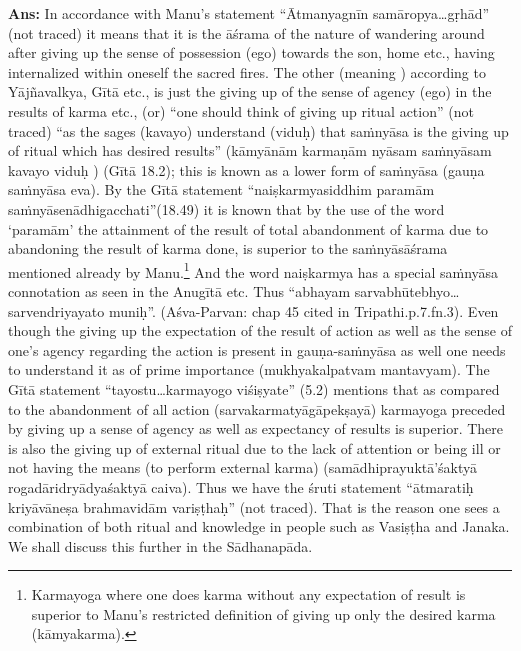 \textbf{Ans:} In accordance with Manu’s statement  “Ātmanyagnīn samāropya\-…gṛhād” (not traced) it means that it is the āśrama of the nature of wandering around after giving up the sense of possession (ego) towards the son, home etc., having internalized within oneself the sacred fires. The other (meaning ) according to Yājñavalkya, Gītā etc., is just the giving up of the sense of agency (ego) in the results of karma etc., (or) “one should think of giving up ritual action” (not traced) “as the sages (kavayo) understand (viduḥ) that saṁnyāsa is the giving up of ritual which has desired results” (kāmyānām karmaṇām nyāsam saṁnyāsam kavayo viduḥ ) (Gītā 18.2); this is known as a lower form of saṁnyāsa (gauṇa saṁnyāsa eva). By the Gītā statement “naiṣkarmyasiddhim paramām saṁnyāsenādhigacchati”(18.49) it  is known that by the use of the word ‘paramām’ the attainment of the result of total abandonment of karma due to abandoning the result of karma done, is superior to the saṁnyāsāśrama mentioned already by Manu.\footnote{Karmayoga where one does karma without any expectation of result is superior to Manu's restricted definition of giving up only the desired karma (kāmyakarma).} And the word naiṣkarmya has a special saṁnyāsa connotation as seen in the Anugītā etc. Thus “abhayam sarvabhūtebhyo…sarvendriyayato muniḥ”. (Aśva-Parvan: chap 45 cited in Tripathi.p.7.fn.3). Even though the giving up the expectation of the result of action as well as the sense of one’s agency regarding the action is present in gauṇa-saṁnyāsa as well one needs to understand it as of prime importance (mukhyakalpatvam mantavyam).  The Gītā statement “tayostu…karmayogo viśiṣyate” (5.2) mentions that as compared to the abandonment of all action (sarvakarmatyāgāpekṣayā) karmayoga preceded by giving up a sense of agency as well as expectancy of results is superior. There is also the giving up of external ritual due to the lack of  attention or being ill or not having the means (to perform external karma) (samādhiprayuktā’śaktyā rogadāridryādyaśaktyā caiva). Thus we have the śruti statement “ātmaratiḥ kriyāvāneṣa brahmavidām variṣṭhaḥ” (not traced). That is the reason one sees a combination of both ritual and knowledge in people such as Vasiṣṭha and Janaka. We shall discuss this further in the Sādhanapāda.


